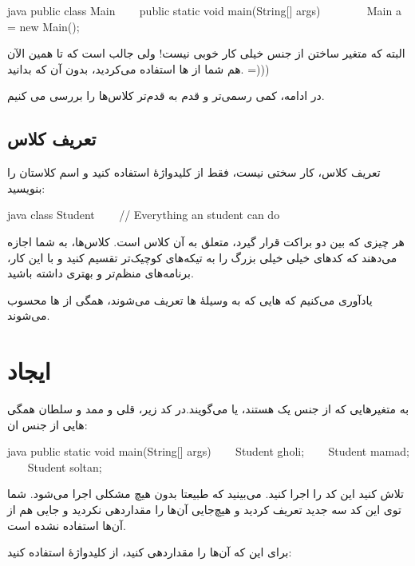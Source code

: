 \begin{codebox}{java}
public class Main {
    public static void main(String[] args) {  
        Main a = new Main();  
    }  
}
\end{codebox}

البته که متغیر ساختن از جنس  خیلی کار خوبی نیست! ولی
جالب است که تا همین الآن هم شما از  ها استفاده
می‌کردید، بدون آن که بدانید. =)))

در ادامه، کمی رسمی‌تر و قدم به قدم‌تر کلاس‌ها را بررسی می کنیم.

\subsection{تعریف کلاس}

تعریف کلاس، کار سختی نیست، فقط از کلیدواژهٔ  استفاده
کنید و اسم کلاستان را بنویسید:

\begin{codebox}{java}
class Student {
    // Everything an student can do
}
\end{codebox}

هر چیزی که بین دو براکت قرار گیرد، متعلق به آن کلاس است. کلاس‌ها، به شما
اجازه می‌دهند که کدهای خیلی خیلی بزرگ را به تیکه‌های کوچیک‌تر تقسیم کنید و
با این کار، برنامه‌های منظم‌تر و بهتری داشته باشید.

یادآوری می‌کنیم که  هایی که به وسیلهٔ  ها
تعریف می‌شوند، همگی از  ها محسوب می‌شوند.

\section{ایجاد }

به متغیرهایی که از جنس یک  هستند،  یا
 می‌گویند.در کد زیر، قلی و ممد و سلطان همگی  هایی
از جنس  ان:

\begin{codebox}{java}
public static void main(String[] args) {  
    Student gholi;  
    Student mamad;  
    Student soltan;  
}
\end{codebox}

تلاش کنید این کد را اجرا کنید. می‌بینید که طبیعتا بدون هیچ مشکلی اجرا
می‌شود. شما توی این کد سه  جدید تعریف کردید و هیچ‌جایی آن‌ها را
مقداردهی نکردید و جایی هم از آن‌ها استفاده نشده است.

برای این که آن‌ها را مقداردهی کنید، از کلید‌واژهٔ  استفاده کنید:

